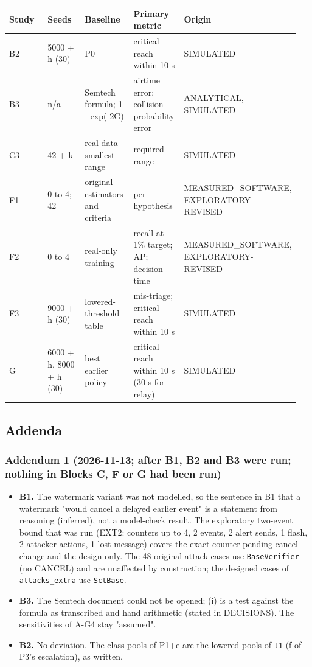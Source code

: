 {\scriptsize\raggedright
\begin{longtable}{p{0.190\linewidth}p{0.190\linewidth}p{0.190\linewidth}p{0.190\linewidth}p{0.190\linewidth}}
\toprule
Study & Seeds & Baseline & Primary metric & Origin \\
\midrule
\endhead
B2 & 5000 + h (30) & P0 & critical reach within 10 s & SIMULATED \\
B3 & n/a & Semtech formula; 1 - exp(-2G) & airtime error; collision probability error & ANALYTICAL, SIMULATED \\
C3 & 42 + k & real-data smallest range & required range & SIMULATED \\
F1 & 0 to 4; 42 & original estimators and criteria & per hypothesis & MEASURED\_SOFTWARE, EXPLORATORY-REVISED \\
F2 & 0 to 4 & real-only training & recall at 1\% target; AP; decision time & MEASURED\_SOFTWARE, EXPLORATORY-REVISED \\
F3 & 9000 + h (30) & lowered-threshold table & mis-triage; critical reach within 10 s & SIMULATED \\
G & 6000 + h, 8000 + h (30) & best earlier policy & critical reach within 10 s (30 s for relay) & SIMULATED \\
\bottomrule
\end{longtable}}

\subsection*{Addenda}

\subsubsection*{Addendum 1 (2026-11-13; after B1, B2 and B3 were run; nothing in Blocks C, F or G had been run)}

\begin{itemize}
\item \textbf{B1.} The watermark variant was not modelled, so the sentence in B1 that a watermark "would cancel a delayed earlier event" is a statement from reasoning (inferred), not a model-check result. The exploratory two-event bound that was run (EXT2: counters up to 4, 2 events, 2 alert sends, 1 flash, 2 attacker actions, 1 lost message) covers the exact-counter pending-cancel change and the design only. The 48 original attack cases use \texttt{BaseVerifier} (no CANCEL) and are unaffected by construction; the designed cases of \texttt{attacks\_extra} use \texttt{SctBase}.
\item \textbf{B3.} The Semtech document could not be opened; (i) is a test against the formula as transcribed and hand arithmetic (stated in DECISIONS). The sensitivities of A-G4 stay "assumed".
\item \textbf{B2.} No deviation. The class pools of P1+e are the lowered pools of \texttt{t1} (f of P3's escalation), as written.
\end{itemize}

